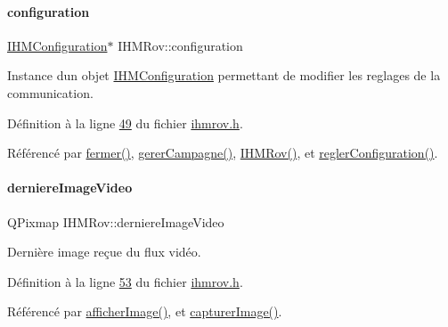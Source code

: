 \paragraph{\texorpdfstring{configuration}{configuration}}
{\footnotesize\ttfamily \hyperlink{class_i_h_m_configuration}{I\+H\+M\+Configuration}$\ast$ I\+H\+M\+Rov\+::configuration\hspace{0.3cm}{\ttfamily [private]}}



Instance d\textquotesingle{}un objet \hyperlink{class_i_h_m_configuration}{I\+H\+M\+Configuration} permettant de modifier les reglages de la communication. 



Définition à la ligne \hyperlink{ihmrov_8h_source_l00049}{49} du fichier \hyperlink{ihmrov_8h_source}{ihmrov.\+h}.



Référencé par \hyperlink{ihmrov_8cpp_source_l00253}{fermer()}, \hyperlink{ihmrov_8cpp_source_l00202}{gerer\+Campagne()}, \hyperlink{ihmrov_8cpp_source_l00015}{I\+H\+M\+Rov()}, et \hyperlink{ihmrov_8cpp_source_l00170}{regler\+Configuration()}.

\mbox{\label{class_i_h_m_rov_a2081e30323773ee895199ec026d82fc8}} 
\paragraph{\texorpdfstring{derniere\+Image\+Video}{derniereImageVideo}}
{\footnotesize\ttfamily Q\+Pixmap I\+H\+M\+Rov\+::derniere\+Image\+Video\hspace{0.3cm}{\ttfamily [private]}}



Dernière image reçue du flux vidéo. 



Définition à la ligne \hyperlink{ihmrov_8h_source_l00053}{53} du fichier \hyperlink{ihmrov_8h_source}{ihmrov.\+h}.



Référencé par \hyperlink{ihmrov_8cpp_source_l00154}{afficher\+Image()}, et \hyperlink{ihmrov_8cpp_source_l00179}{capturer\+Image()}.

\mbox{\label{class_i_h_m_rov_acdeabe02e1431b5c1817cb2a89debd0a}} 
